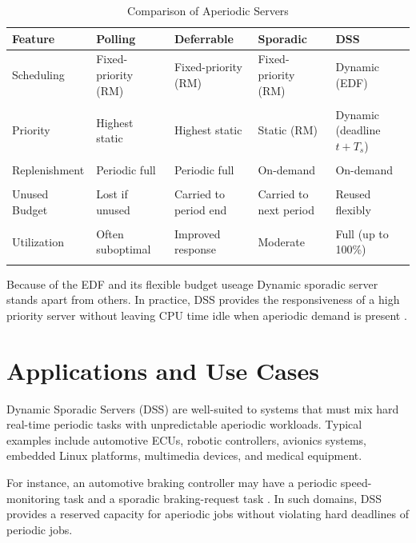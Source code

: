 \documentclass[conference]{IEEEtran}
\begin{document}
\begin{table}[ht]
\centering
\renewcommand{\arraystretch}{1.1} %
\begin{tabularx}{\columnwidth}{l|X|X|X|X}
\textbf{Feature} & \textbf{Polling} & \textbf{Deferrable} & \textbf{Sporadic} & \textbf{DSS} \\
\hline
Scheduling & Fixed-priority (RM) & Fixed-priority (RM) & Fixed-priority (RM) & Dynamic (EDF) \\\\
Priority & Highest static & Highest static & Static (RM) & Dynamic (deadline $t+T_s$) \\\\
Replenishment & Periodic full & Periodic full & On-demand & On-demand \\\\
Unused Budget & Lost if unused & Carried to period end & Carried to next period & Reused flexibly \\\\
Utilization & Often suboptimal & Improved response & Moderate & Full (up to 100\%) \\\\
\end{tabularx}
\caption{Comparison of Aperiodic Servers}
\label{tab:servers}
\end{table}


Because of the EDF and its flexible budget useage Dynamic sporadic server stands apart from others. In practice, DSS provides the responsiveness of a high priority server without leaving CPU time idle when aperiodic demand is present  \cite{buttazzo2011hard, laplante2011real}.

\section{Applications and Use Cases}

Dynamic Sporadic Servers (DSS) are well-suited to systems that must mix hard real-time periodic tasks with unpredictable aperiodic workloads. Typical examples include automotive ECUs, robotic controllers, avionics systems, embedded Linux platforms, multimedia devices, and medical equipment.

For instance, an automotive braking controller may have a periodic speed-monitoring task and a sporadic braking-request task \cite{spuri1994efficient}. In such domains, DSS provides a reserved capacity for aperiodic jobs without violating hard deadlines of periodic jobs.
\end{document}
